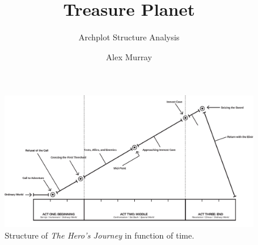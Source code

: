 \documentclass[notitlepage]{fhnwreport}
\title{Treasure Planet}
\subtitle{Archplot Structure Analysis}
\author{Alex Murray}
\begin{document}
\maketitle

\begin{figure}[th!]
    \centering
    \includegraphics[width=\linewidth]{archplot.pdf}
    \caption{Structure of \textit{The Hero's Journey} in function of time.}
    \label{fig:archplot}
\end{figure}
\end{document}
